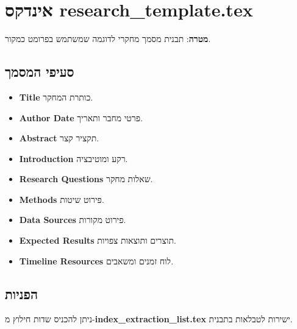 \documentclass[12pt]{article}
\begin{document}
\section*{אינדקס research\_template.tex}
\textbf{מטרה}:
תבנית מסמך מחקרי לדוגמה שמשתמש בפרומט כמקור.

\subsection*{סעיפי המסמך}
\begin{itemize}
  \item \textbf{Title} כותרת המחקר.
  \item \textbf{Author Date} פרטי מחבר ותאריך.
  \item \textbf{Abstract} תקציר קצר.
  \item \textbf{Introduction} רקע ומוטיבציה.
  \item \textbf{Research Questions} שאלות מחקר.
  \item \textbf{Methods} פירוט שיטות.
  \item \textbf{Data Sources} פירוט מקורות.
  \item \textbf{Expected Results} תוצרים ותוצאות צפויות.
  \item \textbf{Timeline Resources} לוח זמנים ומשאבים.
\end{itemize}

\subsection*{הפניות}
ניתן להכניס שדות חילוץ מ-\textbf{index\_extraction\_list.tex} ישירות לטבלאות בתבנית.
\end{document}
